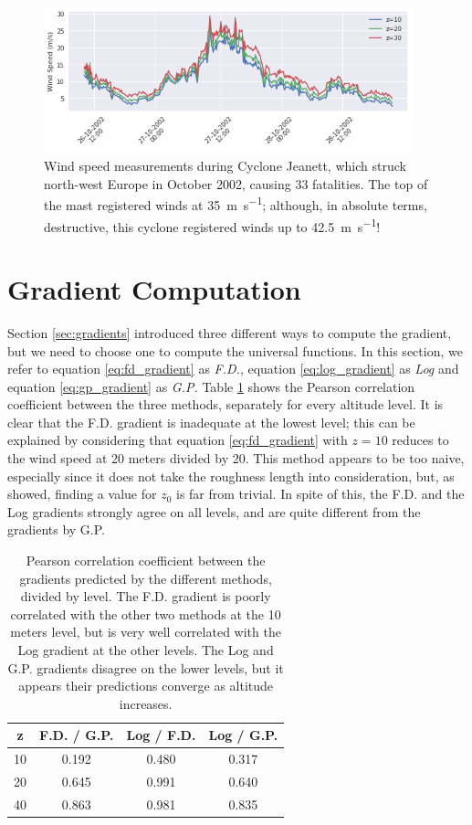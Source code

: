 \documentclass[12pt]{book}
\begin{document}
\begin{figure}
    \centering
	\includegraphics[width=0.95\textwidth]{images/cyclone_jeanett}
	\caption{Wind speed measurements during Cyclone Jeanett, which struck north-west Europe in October 2002, causing 33 fatalities. The top of the mast registered winds at \SI{35}{\meter\per\second}; although, in absolute terms, destructive, this cyclone registered winds up to \SI{42.5}{\meter\per\second}!}
	\label{fig:cyclone_jeanett}
\end{figure}



\section{Gradient Computation}
Section \ref{sec:gradients} introduced three different ways to compute the gradient, but we need to choose one to compute the universal functions. In this section, we refer to equation \ref{eq:fd_gradient} as \emph{F.D.}, equation \ref{eq:log_gradient} as \emph{Log} and equation \ref{eq:gp_gradient} as \emph{G.P.} Table \ref{tbl:gradients_corr} shows the Pearson correlation coefficient between the three methods, separately for every altitude level. It is clear that the F.D. gradient is inadequate at the lowest level; this can be explained by considering that equation \ref{eq:fd_gradient} with $z=10$ reduces to the wind speed at 20 meters divided by 20. This method appears to be too naive, especially since it does not take the roughness length into consideration, but, as \cite{cabauw_z0} showed, finding a value for $z_0$ is far from trivial. In spite of this, the F.D. and the Log gradients strongly agree on all levels, and are quite different from the gradients by G.P.

\begin{table}[]
\centering
\caption{Pearson correlation coefficient between the gradients predicted by the different methods, divided by level. The F.D. gradient is poorly correlated with the other two methods at the 10 meters level, but is very well correlated with the Log gradient at the other levels. The Log and G.P. gradients disagree on the lower levels, but it appears their predictions converge as altitude increases.}
\label{tbl:gradients_corr}
\begin{tabular}{c|c|c|c}
z & F.D. / G.P. & Log / F.D. & Log / G.P. \\ \hline
 	10 & 	0.192 & 0.480 &	0.317 \\
 	20 &	0.645 	& 0.991 &	0.640 \\
 	40 &	0.863 & 0.981 &	0.835 \\
\end{tabular}
\end{table}
\end{document}
